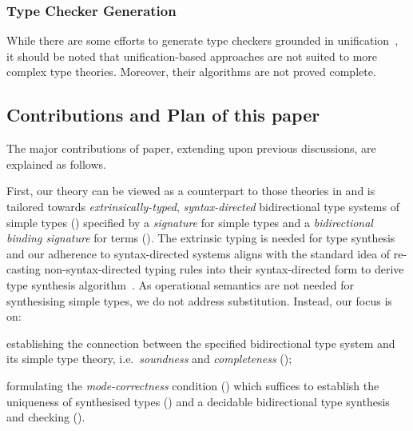 \subsubsection{Type Checker Generation}
While there are some efforts to generate type checkers grounded in unification~\citep{Gast2004,Grewe2015}, it should be noted that unification-based approaches are not suited to more complex type theories.
Moreover, their algorithms are not proved complete.

\subsection{Contributions and Plan of this paper}
The major contributions of paper, extending upon previous discussions, are explained as follows.

First, our theory can be viewed as a counterpart to those theories in  and is tailored towards \emph{extrinsically-typed}, \emph{syntax-directed} bidirectional type systems of simple types () specified by a \emph{signature} for simple types and a \emph{bidirectional binding signature} for terms (). 
The extrinsic typing is needed for type synthesis and our adherence to syntax-directed systems aligns with the standard idea of re-casting non-syntax-directed typing rules into their syntax-directed form to derive type synthesis algorithm~\citep{Peyton-Jones2007}.
As operational semantics are not needed for synthesising simple types, we do not address substitution.
Instead, our focus is on:
\begin{enumerate*}
  \item establishing the connection between the specified bidirectional type system and its simple type theory, i.e.\ \emph{soundness} and \emph{completeness} (); 
  \item formulating the \emph{mode-correctness} condition () which suffices to establish the uniqueness of synthesised types () and a decidable bidirectional type synthesis and checking ().
\end{enumerate*}

